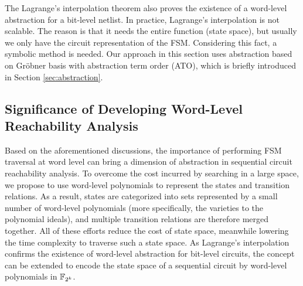 \begin{Example}
\end{Example}

The Lagrange's interpolation theorem also proves the existence of a word-level abstraction for a bit-level netlist.
In practice, Lagrange's interpolation is not scalable. 
The reason is that it needs the entire function (state space), but usually we only have the circuit representation
of the FSM. Considering this fact, a symbolic method is needed.
Our approach in this section uses abstraction based on 
Gr\"obner basis with abstraction term order (ATO), which is briefly introduced in Section \ref{sec:abstraction}.

\subsection{Significance of Developing Word-Level Reachability Analysis}

Based on the aforementioned discussions, the importance of performing FSM traversal at word level 
can bring a dimension of abstraction in sequential circuit reachability analysis.
To overcome the cost incurred by searching in a large space, we propose to use word-level 
polynomials to represent the states and transition relations. As a result, states are categorized into 
sets represented by a small number of word-level polynomials (more specifically, the varieties to the polynomial ideals),
and multiple transition relations are therefore merged together. All of these efforts reduce the cost of 
state space, meanwhile lowering the time complexity to traverse such a state space. As Lagrange's interpolation
confirms the existence of word-level abstraction for bit-level circuits, the concept
can be extended to encode the state space of a sequential circuit by word-level polynomials in ${\mathbb{F}}_{2^k}$.

